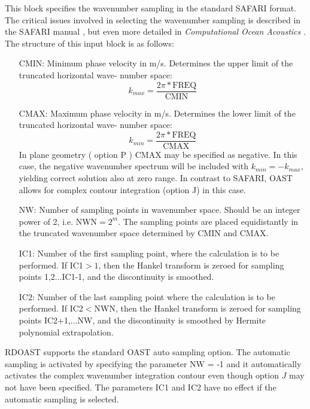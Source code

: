This block specifies the wavenumber sampling in the standard SAFARI
format. The critical issues involved in selecting the wavenumber
sampling is described in the SAFARI manual \cite{hs:saf}, but even
more detailed in {\em Computational Ocean Acoustics} \cite{jkps}. 
The structure of this input block is  as follows:
\begin{itemize}
		\item[CMIN:]   Minimum phase velocity in m/s. Determines the
		upper limit of the truncated horizontal wave-
		number space:
			\begin{displaymath}
			k_{max} = \frac{2\pi \ast \mbox{FREQ}}{\mbox{CMIN}}
			\end{displaymath}
		\item[CMAX:]	Maximum phase velocity in m/s. Determines the
		lower limit of the truncated horizontal wave-
		number space:
			\begin{displaymath}
			k_{min} = \frac{2\pi \ast \mbox{FREQ}}{\mbox{CMAX}}
			\end{displaymath}
		In plane geometry ( option P ) CMAX may be specified as 
		negative. In this case, the negative wavenumber spectrum
		will be included with $k_{min}=-k_{max}$, yielding correct 
		solution also at zero range. In contrast to SAFARI,
OAST allows for complex contour integration (option J) in this case.
		\item[NW:]	Number of sampling points in wavenumber space.
		Should be an integer power of 2, i.e. NWN$=2^{m}$.
		The sampling points are placed equidistantly
		in the truncated wavenumber space determined
		by CMIN and CMAX.

		\item[IC1:]  Number of the first sampling point, where the
		calculation is to be performed. If IC1$>1$, 
		then the Hankel transform is zeroed for sampling 
		points 1,2$\ldots$IC1-1, and the discontinuity
		is smoothed.

		\item[IC2:]	Number of the last sampling point where the 
		calculation is to be performed. If IC2$<$NWN,
		then the Hankel transform is zeroed for sampling
		points IC2+1,$\ldots$NW, and the discontinuity
		is smoothed by Hermite polynomial extrapolation.
		\end{itemize}


    RDOAST supports the standard OAST auto sampling option.
The  automatic sampling  is  activated  by 
specifying the parameter NW = -1 and it automatically  activates 
the  complex wavenumber integration contour even though option  $J$ 
may  not have been specified. The parameters IC1 and IC2 have  no 
effect if the automatic sampling is selected.

